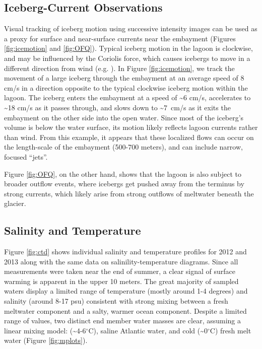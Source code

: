 \documentclass[review]{igs}
\begin{document}
% 


\subsection{Iceberg-Current Observations}
Visual tracking of iceberg motion using successive intensity images can be used as a proxy for surface and near-surface currents near the embayment (Figures \ref{fig:icemotion} and \ref{fig:OFQ}). Typical iceberg motion in the lagoon is clockwise, and may be influenced by the Coriolis force, which causes icebergs to move in a different direction from wind (e.g. \citet{jacka1991antarctic,hulbe}). In Figure \ref{fig:icemotion}, we track the movement of a large iceberg through the embayment at an average speed of 8 cm/s in a direction opposite to the typical clockwise iceberg motion within the lagoon. The iceberg enters the embayment at a speed of \textasciitilde6 cm/s, accelerates to \textasciitilde18 cm/s as it passes through, and slows down to \textasciitilde7~cm/s as it exits the embayment on the other side into the open water. Since  most of the iceberg's volume is below the water surface, its motion likely reflects lagoon currents rather than wind. From this example, it appears that these localized flows can occur on the length-scale of the embayment (500-700 meters), and can include narrow, focused ``jets''. 

Figure \ref{fig:OFQ}, on the other hand, shows that the lagoon is also subject to broader outflow events, where icebergs get pushed away from the terminus by strong currents, which likely arise from strong outflows of meltwater beneath the glacier. 





\subsection{Salinity and Temperature}
Figure \ref{fig:ctd} shows individual salinity and temperature profiles for 2012 and 2013 along with the same data on salinility-temperature diagrams.  Since all measurements were taken near the end of summer, a clear signal of surface warming is apparent in the upper 10 meters. The great majority of sampled waters display a limited range of temperature (mostly around 1-4 degrees) and salinity (around 8-17 psu) consistent with strong mixing between a fresh meltwater component and a salty, warmer ocean component. Despite a limited range of values, two distinct end member water masses are clear, assuming a linear mixing model: (\textasciitilde 4-6$^{\circ}$C), saline Atlantic water, and cold (\textasciitilde 0$^{\circ}$C) fresh melt water (Figure \ref{fig:mplots}). 
\end{document}
